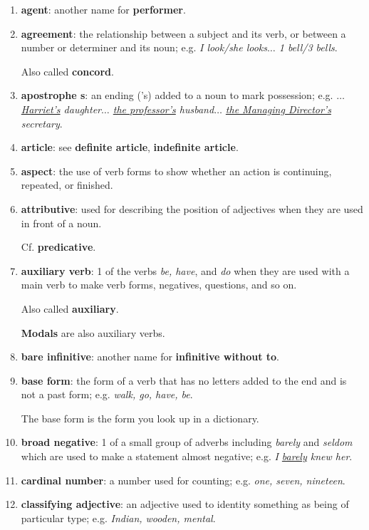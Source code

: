 \documentclass[oneside]{book}
\numberwithin{equation}{section}
\begin{document}
\begin{enumerate}
    Also called \textbf{positive}.
    \item \textbf{agent}: another name for \textbf{performer}.
    \item \textbf{agreement}: the relationship between a subject and its verb, or between a number or determiner and its noun; e.g. \textit{I look/she looks$\ldots$ 1 bell/3 bells}.
    
    Also called \textbf{concord}.
    \item \textbf{apostrophe s}: an ending ('s) added to a noun to mark possession; e.g. \textit{$\ldots$ \underline{Harriet's} daughter$\ldots$ \underline{the professor's} husband$\ldots$ \underline{the Managing Director's} secretary}.
    \item \textbf{article}: see \textbf{definite article}, \textbf{indefinite article}.
    \item \textbf{aspect}: the use of verb forms to show whether an action is continuing, repeated, or finished.
    \item \textbf{attributive}: used for describing the position of adjectives when they are used in front of a noun.
    
    Cf. \textbf{predicative}.
    \item \textbf{auxiliary verb}: 1 of the verbs \textit{be, have}, and \textit{do} when they are used with a main verb to make verb forms, negatives, questions, and so on.
    
    Also called \textbf{auxiliary}.
    
    \textbf{Modals} are also auxiliary verbs.
    \item \textbf{bare infinitive}: another name for \textbf{infinitive without to}.
    \item \textbf{base form}: the form of a verb that has no letters added to the end and is not a past form; e.g. \textit{walk, go, have, be}.
    
    The base form is the form you look up in a dictionary.
    \item \textbf{broad negative}: 1 of a small group of adverbs including \textit{barely} and \textit{seldom} which are used to make a statement almost negative; e.g. \textit{I \underline{barely} knew her}.
    \item \textbf{cardinal number}: a number used for counting; e.g. \textit{one, seven, nineteen}.
    \item \textbf{classifying adjective}: an adjective used to identity something as being of particular type; e.g. \textit{Indian, wooden, mental}.
    

\end{enumerate}
\end{document}
